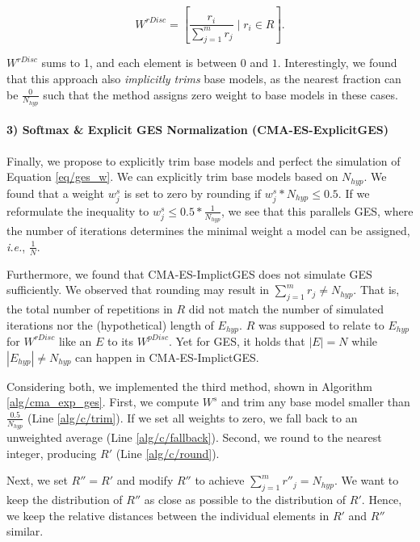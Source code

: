 \documentclass[11pt]{article}
\newcommand{\nbc}[3]{
		{\colorbox{#3}{\bfseries\sffamily\scriptsize\textcolor{white}{#1}}}
		{\textcolor{#3}{\sf\small$\blacktriangleright$\textit{#2}$\blacktriangleleft$}}
}
\newcommand{\changed}[1]{\nbc{CHANGED}{#1}{changedcolor}}
\renewcommand{\changed}[1]{{\color{changedcolor}#1}}
\renewcommand{\changed}[1]{{#1}}
\begin{document}
\begin{equation}
    W^{rDisc} = \left[\frac{r_i}{\sum_{j=1}^m r_j} \; | \; r_i \in R \right].
    \label{eq/w_disc}
\end{equation}

$W^{rDisc}$ sums to 1, and each element is between $0$ and $1$. 
Interestingly, we found that this approach also \emph{implicitly trims} base models, as the nearest fraction can be $\frac{0}{N_{hyp}}$ such that the method assigns zero weight to base models in these cases. 

\paragraph{3) Softmax \& Explicit GES Normalization (CMA-ES-ExplicitGES)} 
Finally, we propose to explicitly trim base models and perfect the simulation of Equation \ref{eq/ges_w}.
We can explicitly trim base models based on $N_{hyp}$.
We found that a weight $w_j^s$ is set to zero by rounding if $w_j^s*N_{hyp} \leq 0.5$.
If we reformulate the inequality to $w_j^s \leq 0.5*\frac{1}{N_{hyp}}$, we see that this parallels GES, where the number of iterations determines the minimal weight a model can be assigned, \emph{i.e.}, $\frac{1}{N}$. 

Furthermore, we found that CMA-ES-ImplictGES does not simulate GES sufficiently.
We observed that rounding may result in $\sum_{j=1}^m r_j \neq N_{hyp}$. 
That is, the total number of repetitions in $R$ did not match the number of simulated iterations nor the (hypothetical) length of $E_{hyp}$. 
$R$ was supposed to relate to $E_{hyp}$ for $W^{rDisc}$ like an $E$ to its $W^{pDisc}$. 
Yet for GES, it holds that $|E| = N$ while $|E_{hyp}| \neq N_{hyp}$ can happen in CMA-ES-ImplictGES. 

Considering both, we implemented the third method, \changed{shown in Algorithm \ref{alg/cma_exp_ges}}.
First, we compute $W^{s}$ and trim any base model smaller than $\frac{0.5}{N_{hyp}}$ \changed{(Line \ref{alg/c/trim})}.
If we set all weights to zero, we fall back to an unweighted average \changed{(Line \ref{alg/c/fallback})}.
Second, we round to the nearest integer, producing $R'$ \changed{(Line \ref{alg/c/round})}. 

Next, we set $R'' = R'$ and modify $R''$ to achieve $\sum_{j=1}^m r''_j = N_{hyp}$.
We want to keep the distribution of $R''$ as close as possible to the distribution of $R'$.
Hence, we keep the relative distances between the individual elements in $R'$ and $R''$ similar.  
\end{document}
